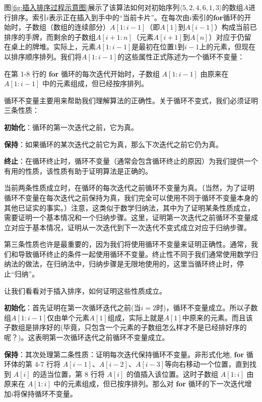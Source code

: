 \documentclass[lang=cn,newtx,10pt,scheme=chinese]{elegantbook}
\begin{document}
图\ref{fig:插入排序过程示意图}展示了该算法如何对初始序列$\langle 5,2,4,6,1,3\rangle$的数组$A$进行排序。索引$i$表示正在插入到手中的“当前卡片”。在每次由$i$索引的\textbf{for}循环的开始时，子数组（数组的连续部分）$A[1:i-1]$（即$A[1]$到$A[i-1]$）构成当前已排序的手牌，而剩余的子数组$A[i+1:n]$（元素$A[i+1]$到$A[n]$）对应于仍留在桌上的牌堆。实际上，元素$A[1:i-1]$是最初在位置1到$i-1$上的元素，但现在以排序顺序排列。我们将$A[1:i-1]$的这些属性正式陈述为一个循环不变量：

\begin{tcolorbox}
在第 1-8 行的 \textbf{for} 循环的每次迭代开始时，子数组 $A[1:i-1]$ 由原来在 $A[1:i-1]$ 中的元素组成，但已经按序排列。
\end{tcolorbox}

循环不变量主要用来帮助我们理解算法的正确性。关于循环不变式，我们必须证明三条性质：

\textbf{初始化}：循环的第一次迭代之前，它为真。

\textbf{保持}：如果循环的某次迭代之前它为真，那么下次迭代之前它仍为真。

\textbf{终止}：在循环终止时，循环不变量（通常会包含循环终止的原因）为我们提供一个有用的性质，该性质有助于证明算法是正确的。

当前两条性质成立时，在循环的每次迭代之前循环不变量为真。（当然，为了证明循环不变量在每次迭代之前保持为真，我们完全可以使用不同于循环不变量本身的其他已证实的事实。）注意，这类似于数学归纳法，其中为了证明某条性质成立，需要证明一个基本情况和一个归纳步骤。这里，证明第一次迭代之前循环不变量成立对应于基本情况，证明从一次迭代到下一次迭代不变式成立对应于归纳步骤。

第三条性质也许是最重要的，因为我们将使用循环不变量来证明正确性。通常，我们和导致循环终止的条件一起使用循环不变量。终止性不同于我们通常使用数学归纳法的做法，在归纳法中，归纳步骤是无限地使用的，这里当循环终止时，停止``归纳''。

让我们看看对于插入排序，如何证明这些性质成立。

\textbf{初始化}：首先证明在第一次循环迭代之前(当$i=2$时)，循环不变量成立。所以子数组$A[1:i-1]$仅由单个元素$A[1]$组成，实际上就是$A[1]$中原来的元素。而且该子数组是排序好的(毕竟，只包含一个元素的子数组怎么样才不是已经排好序的呢？)。这表明第一次循环迭代之前循环不变量成立。

\textbf{保持}：其次处理第二条性质：证明每次迭代保持循环不变量。非形式化地, \textbf{for} 循环体的第 4-7 行将 $A[i-1]$、$A[i-2]$、$A[i-3]$等向右移动一个位置，直到找到 $A[i]$ 的适当位置，第 8 行将 $A[i]$ 的值插入该位置。这时子数组 $A[1:i]$ 由原来在 $A[1:i]$ 中的元素组成，但已按序排列。那么对 \textbf{for} 循环的下一次迭代增加$i$将保持循环不变量。
\end{document}
